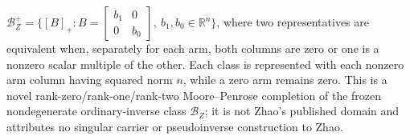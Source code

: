 \(\mathcal B_Z^+=\{[B]_+:B=\begin{bmatrix}b_1&0\\0&b_0\end{bmatrix},\ b_1,b_0\in\mathbb R^n\}\), where two representatives are equivalent when, separately for each arm, both columns are zero or one is a nonzero scalar multiple of the other.  Each class is represented with each nonzero arm column having squared norm \(n\), while a zero arm remains zero.  This is a novel rank-zero/rank-one/rank-two Moore--Penrose completion of the frozen nondegenerate ordinary-inverse class \(\mathcal B_Z\); it is not Zhao's published domain and attributes no singular carrier or pseudoinverse construction to Zhao.